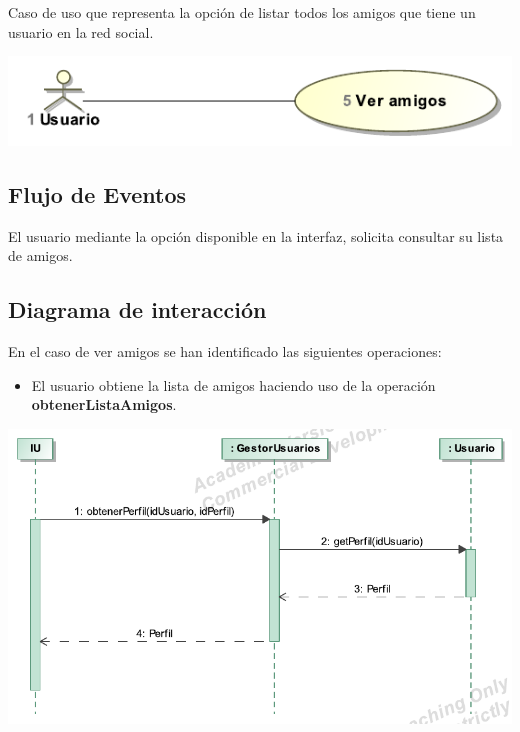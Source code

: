 \documentclass[12pt, a4paper, titlepage]{article}
\begin{document}
Caso de uso que representa la opción de listar todos los amigos que tiene un usuario en la red social.

\begin{center}
	\includegraphics{Imagenes/VerAmigosCU.pdf}
\end{center}
\subsection{Flujo de Eventos}

El usuario mediante la opción disponible en la interfaz, solicita consultar su lista de amigos.

\subsection{Diagrama de interacción}

En el caso de {\sc ver amigos } se han identificado las siguientes operaciones:

\begin{itemize}
	\item El usuario obtiene la lista de amigos haciendo uso de la operación \textbf{obtenerListaAmigos}.
\end{itemize}

\begin{center}
	\includegraphics{Imagenes/OperacionObtenerPerfil}
\end{center}
\end{document}

